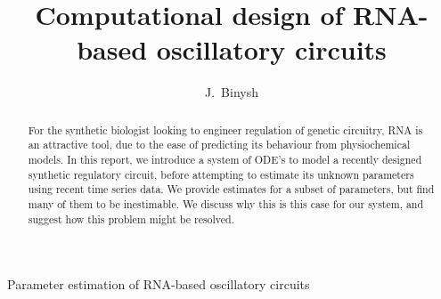 \documentclass[10pt,journal]{./IEEE_latex_class/IEEEtran}
\begin{document}
%
\title{Computational design of RNA-based oscillatory circuits}

\author{J.~Binysh
        \\ }

%
{Parameter estimation of RNA-based oscillatory circuits}

\maketitle

\thispagestyle{empty}

\newcommand{\MYheader}{\smash{\scriptsize

\hfil\parbox[t][\height][t]{\textwidth}{\centering {\normalsize
Place conference title here}}\hfil\hbox{}}}
\makeatletter

\if@twoside
  \def\ps@headings{%
      \let\@oddfoot\@empty\let\@evenfoot\@empty
      \def\@evenhead{\small\thepage\hfil\leftmark\strut\vadjust{\vskip .1ex\hrule}}%
      \def\@oddhead{\small\rightmark\hfil\thepage\strut\vadjust{\vskip .1ex\hrule}}%
      \let\@mkboth\markboth
    \def\chaptermark##1{%
      \markboth{\scshape%
        \ifnum \c@secnumdepth >\m@ne
            \@chapapp\ \thechapter. \ %
        \fi
        ##1}{}}%
    \def\sectionmark##1{%
      \markright{\scshape%
        \ifnum \c@secnumdepth >\z@
          \thesection. \ %
        \fi
        ##1}}}
\else
  \def\ps@headings{%
    \let\@oddfoot\@empty
    \def\@oddhead{{\slshape\rightmark}\hfil\thepage\ of\ \pageref{LastPage} \strut\vadjust{\vskip .1ex\hrule}}%
    \let\@mkboth\markboth
    \def\chaptermark##1{%
      \markright{\scshape%
        \ifnum \c@secnumdepth >\m@ne
            \@chapapp\ \thechapter. \ %
        \fi
        ##1}}}
\fi
\makeatother

\makeatother

\pagestyle{headings}

\begin{abstract}
For the synthetic biologist looking to engineer regulation of genetic circuitry, RNA is an attractive tool, due to the ease of predicting its behaviour from physiochemical models. In this report, we introduce a system of ODE's to model a recently designed synthetic regulatory circuit, before attempting to estimate its unknown parameters using recent time series data. We provide estimates for a subset of parameters, but find many of them to be inestimable. We discuss why this is this case for our system, and suggest how this problem might be resolved.
\end{abstract}
\end{document}
